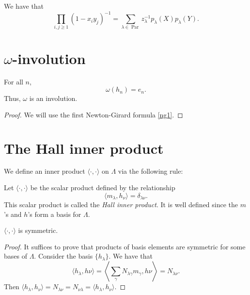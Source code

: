 \documentclass{article}
\DeclareMathOperator{\Par}{Par}
\begin{document}
\begin{theorem}\label{CauchyIdentityForPP}
    We have that
    \[
        \prod_{i,j \geq 1} (1-x_iy_j)^{-1} = \sum_{\lambda\in\Par} z_\lambda^{-1}p_\lambda(X) p_\lambda(Y).
    \]
\end{theorem}

\section{\texorpdfstring{$\omega$}{w}-involution}


\begin{theorem}
    For all $n$,
    \[
        \omega(h_n) = e_n.
    \]
    Thus, $\omega$ is an involution.
\end{theorem}

\begin{proof}
    We will use the first Newton-Girard formula \eqref{ng1}.
\end{proof}

\section{The Hall inner product}

We define an inner product $\langle \cdot, \cdot \rangle$ on $\Lambda$ via the following rule:

\begin{definition} Let $\langle\cdot,\cdot\rangle$ be the scalar product defined by the relationship
    \[
        \langle m_\lambda, h_\nu \rangle = \delta_{\lambda\nu}.
    \]
    This scalar product is called the \textit{Hall inner product}. It is well defined since the $m$'s and $h$'s form a basis for $\Lambda$.
\end{definition}

\begin{theorem}
    $\langle\cdot,\cdot\rangle$ is symmetric.
\end{theorem}

\begin{proof}
    It suffices to prove that products of basis elements are symmetric for some bases of $\Lambda$. Consider the basis $\{h_\lambda\}$. We have that
    \[
        \langle h_\lambda, h\nu \rangle = \left\langle \sum_{\gamma} N_{\lambda\gamma} m_\gamma, h\nu \right\rangle = N_{\lambda\nu}.
    \]
    Then $\langle h_\lambda, h_\nu \rangle = N_{\lambda\nu} = N_{\nu\lambda} = \langle h_\lambda, h_\nu \rangle$.
\end{proof}
\end{document}
